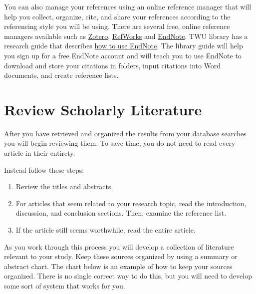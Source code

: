 \documentclass[
  letterpaper,
  DIV=11,
  numbers=noendperiod]{scrreprt}
\providecommand{\tightlist}{%
  \setlength{\itemsep}{0pt}\setlength{\parskip}{0pt}}\usepackage{longtable,booktabs,array}
\begin{document}
You can also manage your references using an online reference manager
that will help you collect, organize, cite, and share your references
according to the referencing style you will be using. There are several
free, online reference managers available such as
\href{https://www.zotero.org/}{Zotero},
\href{https://www.refworks.com/refworks2/help/Welcome.htm}{RefWorks} and
\href{http://endnote.com/}{EndNote}. TWU library has a research guide
that describes \href{http://libguides.twu.ca/EndNote/}{how to use
EndNote}. The library guide will help you sign up for a free EndNote
account and will teach you to use EndNote to download and store your
citations in folders, input citations into Word documents, and create
reference lists.

\section*{Review Scholarly
Literature}\label{review-scholarly-literature}


After you have retrieved and organized the results from your database
searches you will begin reviewing them. To save time, you do not need to
read every article in their entirety.

Instead follow these steps:

\begin{enumerate}
\def\labelenumi{\arabic{enumi}.}
\tightlist
\item
  Review the titles and abstracts.
\item
  For articles that seem related to your research topic, read the
  introduction, discussion, and conclusion sections. Then, examine the
  reference list.
\item
  If the article still seems worthwhile, read the entire article.
\end{enumerate}

As you work through this process you will develop a collection of
literature relevant to your study. Keep these sources organized by using
a summary or abstract chart. The chart below is an example of how to
keep your sources organized. There is no single correct way to do this,
but you will need to develop some sort of system that works for you.
\end{document}
